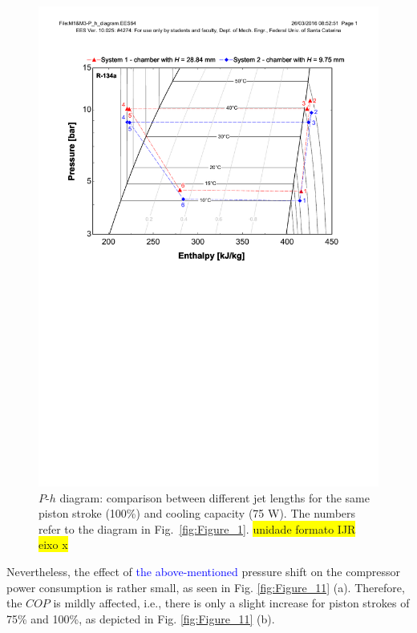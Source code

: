 \documentclass[review,preprint,12pt]{elsarticle}
\begin{document}
\begin{figure}[!htp]
\centering
\includegraphics[angle=0,scale=0.6]{Figure_10.pdf}
\caption{$P$-$h$ diagram: comparison between different jet lengths for the same piston stroke (100\%) and cooling capacity (75 W). The numbers refer to the diagram in Fig.~\ref{fig:Figure_1}. \colorbox{yellow}{unidade formato  IJR eixo x}}
\label{fig:Figure_10}
\end{figure} 

Nevertheless, the effect of \textcolor{blue}{the above-mentioned} pressure shift on the compressor power consumption is rather small, as seen in Fig. \ref{fig:Figure_11} (a). Therefore, the $COP$ is mildly affected, i.e., there is only a slight increase for piston strokes of 75\% and 100\%, as depicted in Fig. \ref{fig:Figure_11} (b).
\end{document}
